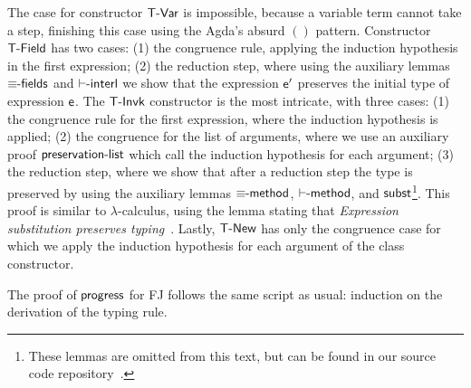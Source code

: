 \documentclass[tese,capa,english]{texufpel}
\newcommand{\D}[1]{\blue{\mathsf{#1}}}
\newcommand{\Con}[1]{\green{\mathsf{#1}}}
\newcommand{\F}[1]{\blue{\mathsf{#1}}}
\newcommand{\V}[1]{\black{\mathsf{#1}}}
\begin{document}
The case for constructor \ensuremath{\Con{T\textrm{-}Var}} is impossible, because a variable term cannot take a step, finishing this case using the Agda's absurd \ensuremath{()} pattern. Constructor \ensuremath{\Con{T\textrm{-}Field}} has two cases: (1) the congruence rule, applying the induction hypothesis in the first expression; (2) the reduction step, where using the auxiliary lemmas \ensuremath{\D{\equiv\hspace{-3pt}\textrm{-}fields}} and \ensuremath{\D{\vdash\hspace{-3pt}\textrm{-}interl}} we show that the expression \ensuremath{\V{e'}} preserves the initial type of expression \ensuremath{\V{e}}. The \ensuremath{\Con{T\textrm{-}Invk}} constructor is the most intricate, with three cases: (1) the congruence rule for the first expression, where the induction hypothesis is applied; (2) the congruence for the list of arguments, where we use an auxiliary proof \ensuremath{\D{preservation\textrm{-}list}} which call the induction hypothesis for each argument; (3) the reduction step, where we show that after a reduction step the type is preserved by using the auxiliary lemmas \ensuremath{\D{\equiv\hspace{-3pt}\textrm{-}method}}, \ensuremath{\D{\vdash\hspace{-3pt}\textrm{-}method}}, and \ensuremath{\D{subst}}\footnote{These lemmas are omitted from this text, but can be found in our source code repository~\cite{repos}.}. This proof is similar to $\lambda$-calculus, using the lemma stating that \emph{Expression substitution preserves typing}~\cite{Igarashi:2001:FJM:503502.503505}. Lastly, \ensuremath{\Con{T\textrm{-}New}} has only the congruence case for which we apply the induction hypothesis for each argument of the class constructor.

\pagebreak

The proof of \ensuremath{\F{progress}} for FJ follows the same script as usual: induction on the derivation of the typing rule.

\vspace{-1ex}
\end{document}
